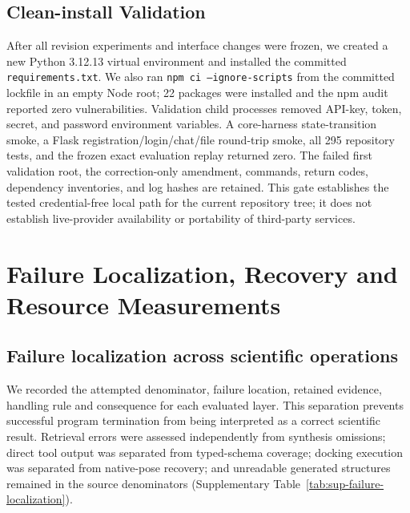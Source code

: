\documentclass{article}
\begin{document}
\subsection{Clean-install Validation}

After all revision experiments and interface changes were frozen, we created a new Python 3.12.13 virtual environment and installed the committed \texttt{requirements.txt}. We also ran \texttt{npm ci --ignore-scripts} from the committed lockfile in an empty Node root; 22 packages were installed and the npm audit reported zero vulnerabilities. Validation child processes removed API-key, token, secret, and password environment variables. A core-harness state-transition smoke, a Flask registration/login/chat/file round-trip smoke, all 295 repository tests, and the frozen exact evaluation replay returned zero. The failed first validation root, the correction-only amendment, commands, return codes, dependency inventories, and log hashes are retained. This gate establishes the tested credential-free local path for the current repository tree; it does not establish live-provider availability or portability of third-party services.

\section{Failure Localization, Recovery and Resource Measurements}\label{secFailure}

\subsection{Failure localization across scientific operations}

We recorded the attempted denominator, failure location, retained evidence, handling rule and consequence for each evaluated layer. This separation prevents successful program termination from being interpreted as a correct scientific result. Retrieval errors were assessed independently from synthesis omissions; direct tool output was separated from typed-schema coverage; docking execution was separated from native-pose recovery; and unreadable generated structures remained in the source denominators (Supplementary Table~\ref{tab:sup-failure-localization}).
\end{document}
